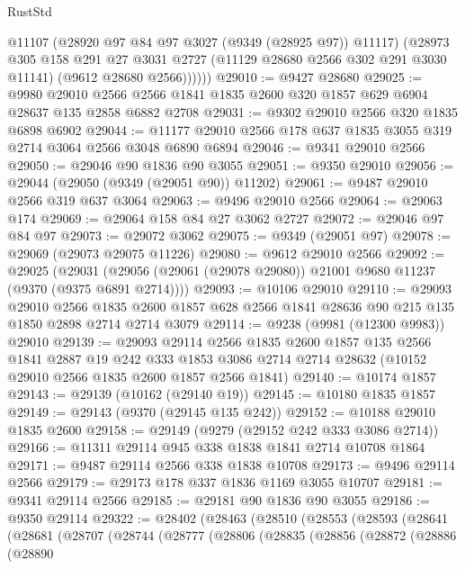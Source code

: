 \begin{lexlean}{RustStd}
\begin{coremodule}
            @11107
            (@28920 @97 @84 @97 @3027 (@9349 (@28925 @97)) @11117)
            (@28973
              @305
              @158
              @291
              @27
              @3031
              @2727
              (@11129 @28680 @2566 @302 @291 @3030 @11141)
              (@9612 @28680 @2566))))))
@29010 := @9427 @28680
@29025 := @9980
    @29010
    @2566
    @2566
    @1841
    @1835
    @2600
    @320
    @1857
    @629
    @6904
    @28637
    @135
    @2858
    @6882
    @2708
@29031 := @9302 @29010 @2566 @320 @1835 @6898 @6902
@29044 := @11177 @29010 @2566 @178 @637 @1835 @3055 @319 @2714 @3064 @2566 @3048 @6890 @6894
@29046 := @9341 @29010 @2566
@29050 := @29046 @90 @1836 @90 @3055
@29051 := @9350 @29010
@29056 := @29044 (@29050 (@9349 (@29051 @90)) @11202)
@29061 := @9487 @29010 @2566 @319 @637 @3064
@29063 := @9496 @29010 @2566
@29064 := @29063 @174
@29069 := @29064 @158 @84 @27 @3062 @2727
@29072 := @29046 @97 @84 @97
@29073 := @29072 @3062
@29075 := @9349 (@29051 @97)
@29078 := @29069 (@29073 @29075 @11226)
@29080 := @9612 @29010 @2566
@29092 := @29025
    (@29031 (@29056 (@29061 (@29078 @29080)) @21001 @9680 @11237 (@9370 (@9375 @6891 @2714))))
@29093 := @10106 @29010
@29110 := @29093
    @29010
    @2566
    @1835
    @2600
    @1857
    @628
    @2566
    @1841
    @28636
    @90
    @215
    @135
    @1850
    @2898
    @2714
    @2714
    @3079
@29114 := @9238 (@9981 (@12300 @9983)) @29010
@29139 := @29093
    @29114
    @2566
    @1835
    @2600
    @1857
    @135
    @2566
    @1841
    @2887
    @19
    @242
    @333
    @1853
    @3086
    @2714
    @2714
    @28632
    (@10152 @29010 @2566 @1835 @2600 @1857 @2566 @1841)
@29140 := @10174 @1857
@29143 := @29139 (@10162 (@29140 @19))
@29145 := @10180 @1835 @1857
@29149 := @29143 (@9370 (@29145 @135 @242))
@29152 := @10188 @29010 @1835 @2600
@29158 := @29149 (@9279 (@29152 @242 @333 @3086 @2714))
@29166 := @11311 @29114 @945 @338 @1838 @1841 @2714 @10708 @1864
@29171 := @9487 @29114 @2566 @338 @1838 @10708
@29173 := @9496 @29114 @2566
@29179 := @29173 @178 @337 @1836 @1169 @3055 @10707
@29181 := @9341 @29114 @2566
@29185 := @29181 @90 @1836 @90 @3055
@29186 := @9350 @29114
@29322 := @28402
    (@28463
      (@28510
        (@28553
          (@28593
            (@28641
              (@28681
                (@28707
                  (@28744
                    (@28777
                      (@28806
                        (@28835
                          (@28856
                            (@28872
                              (@28886
                                (@28890

\end{coremodule}
\end{lexlean}
